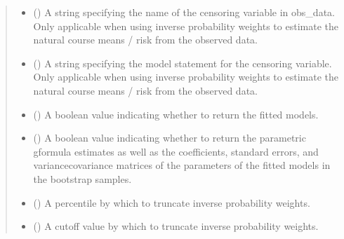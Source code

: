 \documentclass[letterpaper,10pt,english]{sphinxmanual}
\begin{document}
\begin{fulllineitems}
\begin{quote}
\begin{description}
\begin{itemize}
\item {} 
\sphinxAtStartPar
{} (\sphinxstyleliteralemphasis{\sphinxupquote{, }}) \textendash{} A string specifying the name of the censoring variable in obs\_data. Only applicable when using inverse
probability weights to estimate the natural course means / risk from the observed data.

\item {} 
\sphinxAtStartPar
{} (\sphinxstyleliteralemphasis{\sphinxupquote{, }}) \textendash{} A string specifying the model statement for the censoring variable. Only applicable when using inverse
probability weights to estimate the natural course means / risk from the observed data.

\item {} 
\sphinxAtStartPar
{} (\sphinxstyleliteralemphasis{\sphinxupquote{, }}) \textendash{} A boolean value indicating whether to return the fitted models.

\item {} 
\sphinxAtStartPar
{} (\sphinxstyleliteralemphasis{\sphinxupquote{, }}) \textendash{} A boolean value indicating whether to return the parametric g\sphinxhyphen{}formula estimates as well as the coefficients,
standard errors, and variance\sphinxhyphen{}covariance matrices of the parameters of the fitted models in the bootstrap samples.

\item {} 
\sphinxAtStartPar
{} (\sphinxstyleliteralemphasis{\sphinxupquote{, }}) \textendash{} A percentile by which to truncate inverse probability weights.

\item {} 
\sphinxAtStartPar
{} (\sphinxstyleliteralemphasis{\sphinxupquote{, }}) \textendash{} A cutoff value by which to truncate inverse probability weights.


\end{itemize}
\end{description}
\end{quote}
\end{fulllineitems}
\end{document}
